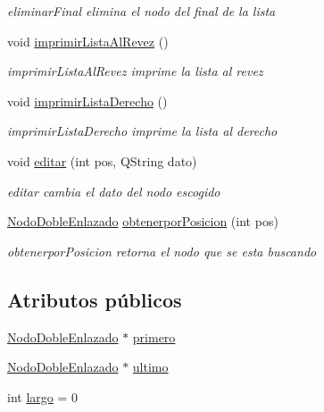 \begin{DoxyCompactItemize}
\begin{DoxyCompactList}\small\item\em eliminar\+Final elimina el nodo del final de la lista \end{DoxyCompactList}\item 
void \mbox{\hyperlink{class_doble_linked_list_a9f02eca02307a94a532424a356da4025}{imprimir\+Lista\+Al\+Revez}} ()
\begin{DoxyCompactList}\small\item\em imprimir\+Lista\+Al\+Revez imprime la lista al revez \end{DoxyCompactList}\item 
void \mbox{\hyperlink{class_doble_linked_list_afc95087af1c6fbf8ac288aa1f7615d5e}{imprimir\+Lista\+Derecho}} ()
\begin{DoxyCompactList}\small\item\em imprimir\+Lista\+Derecho imprime la lista al derecho \end{DoxyCompactList}\item 
void \mbox{\hyperlink{class_doble_linked_list_ac38404371034c6f3d41a93331e51b2a0}{editar}} (int pos, Q\+String dato)
\begin{DoxyCompactList}\small\item\em editar cambia el dato del nodo escogido \end{DoxyCompactList}\item 
\mbox{\hyperlink{class_nodo_doble_enlazado}{Nodo\+Doble\+Enlazado}} \mbox{\hyperlink{class_doble_linked_list_a8a62559b4da97d6de2d9d06a5ce955ab}{obtenerpor\+Posicion}} (int pos)
\begin{DoxyCompactList}\small\item\em obtenerpor\+Posicion retorna el nodo que se esta buscando \end{DoxyCompactList}\end{DoxyCompactItemize}
\subsection*{Atributos públicos}
\begin{DoxyCompactItemize}
\item 
\mbox{\hyperlink{class_nodo_doble_enlazado}{Nodo\+Doble\+Enlazado}} $\ast$ \mbox{\hyperlink{class_doble_linked_list_a5651f51045898d3e272ec95287188c7e}{primero}}
\item 
\mbox{\hyperlink{class_nodo_doble_enlazado}{Nodo\+Doble\+Enlazado}} $\ast$ \mbox{\hyperlink{class_doble_linked_list_a214e9f144816aeab27d51ccf5c4b4e24}{ultimo}}
\item 
int \mbox{\hyperlink{class_doble_linked_list_a4e2387928a3bc6d85baf2ab22578d964}{largo}} = 0
\end{DoxyCompactItemize}


